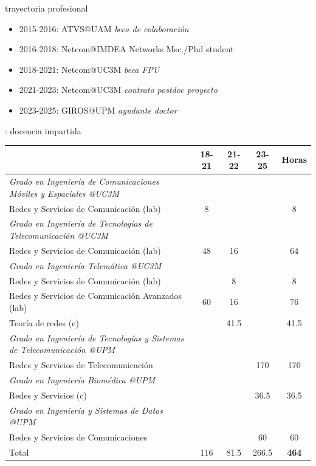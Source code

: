 \documentclass[xcolor=table,xcolor=x11names]{beamer}
\begin{document}
\begin{frame}{\secname}{trayectoria profesional}
    \begin{itemize}
        \item 2015-2016: ATVS@UAM \emph{beca de colaboración}
        \item 2016-2018: Netcom@IMDEA Networks Msc./Phd student
        \item 2018-2021: Netcom@UC3M \emph{beca FPU}
        \item 2021-2023: Netcom@UC3M \emph{contrato postdoc proyecto}
        \item 2023-2025: GIROS@UPM \emph{ayudante doctor}
    \end{itemize}
\end{frame}



\begin{frame}{\secname: docencia impartida}
    \begin{table}
        \centering
        \tiny
        \begin{tabular}{ p{6cm} | c c c c}
            \toprule
             & \textbf{18-21} & \textbf{21-22} & \textbf{23-25} & \textbf{Horas}\\ \midrule
            \rowcolor{upmblue!20}\emph{Grado en Ingeniería de Comunicaciones Móviles y Espaciales @UC3M} & & & &\\ 
            Redes y Servicios de Comunicación (lab) & 8 &   &  & 8\\ \midrule
            \rowcolor{upmblue!20}\emph{Grado en Ingeniería de Tecnologías de Telecomunicación @UC3M} & & & &\\ 
            Redes y Servicios de Comunicación (lab) & 48 & 16  &  & 64\\ \midrule
            \rowcolor{upmblue!20}\emph{Grado en Ingeniería Telemática @UC3M} & & & &\\ 
            Redes y Servicios de Comunicación (lab) &   & 8 &  & 8 \\ 
            Redes y Servicios de Comunicación Avanzados (lab) & 60 & 16  &  & 76\\ 
            Teoría de redes (c) &  & 41.5  &  & 41.5\\ \midrule
            \rowcolor{upmblue!20}\emph{Grado en Ingeniería de Tecnologías y Sistemas de Telecomunicación @UPM} & & & &\\ 
            Redes y Servicios de Telecomunicación &  &    & 170  & 170\\ \midrule
            \rowcolor{upmblue!20}\emph{Grado en Ingeniería Biomédica @UPM} & & &  &  \\ 
            Redes y Servicios (c) &  &   & 36.5 & 36.5\\ \midrule
            \rowcolor{upmblue!20}\emph{Grado en Ingeniería y Sistemas de Datos @UPM} & & & &\\ 
            Redes y Servicios de Comunicaciones &  &  & 60 & 60\\ \midrule
           \rowcolor{gray!30} Total & 116 & 81.5 & 266.5 & \textbf{464}\\ \bottomrule
        \end{tabular}
    \end{table}
\end{frame}
\end{document}

